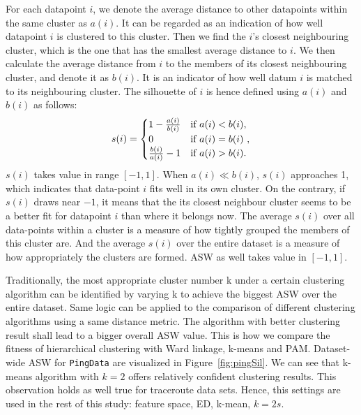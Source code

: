 For each datapoint $i$, we denote the average distance to other datapoints within the same cluster as $a(i)$.
It can be regarded as an indication of how well datapoint $i$ is clustered to this cluster. 
Then we find the $i$'s closest neighbouring cluster, which is the one that has the smallest average distance to $i$. 
We then calculate the average distance from $i$ to the members of its closest neighbouring cluster, and denote it as $b(i)$. It is an indicator of how well datum $i$ is matched to its neighbouring cluster. 
The silhouette of $i$ is hence defined using $a(i)$ and $b(i)$ as follows:
\begin{align*}
s(i) =
\begin{cases} 
       1-\frac{a(i)}{b(i)}    \hfill & \text{if $a(i)<b(i)$}, \\
       0 \hfill & \text{if $a(i) = b(i)$ }, \\
       \frac{b(i)}{a(i)} - 1 \hfill & \text{if $a(i)>b(i)$}.\\
  \end{cases}
\end{align*}
$s(i)$ takes value in range $[-1,1]$. When $a(i) \ll b(i)$, $s(i)$ approaches 1, which indicates that data-point $i$ fits well in its own cluster. 
On the contrary, if $s(i)$ draws near $-1$, it means that the its closest neighbour cluster seems to be a better fit for datapoint $i$ than where it belongs now. 
The average $s(i)$ over all data-points within a cluster is a measure of how tightly grouped the members of this cluster are. 
And the average $s(i)$ over the entire dataset is a measure of how appropriately the clusters are formed.
\ac{ASW} as well takes value in $[-1,1]$.

Traditionally, the most appropriate cluster number k under a certain clustering algorithm can be identified by varying k to achieve the biggest \ac{ASW} over the entire dataset.
Same logic can be applied to the comparison of different clustering algorithms using a same distance metric.
The algorithm with better clustering result shall lead to a bigger overall \ac{ASW} value.
This is how we compare the fitness of hierarchical clustering with Ward linkage, k-means and \ac{PAM}.
Dataset-wide \ac{ASW} for \texttt{PingData} are visualized in Figure~\ref{fig:pingSil}. We can see that k-means algorithm with $k=2$ offers relatively confident clustering results. 
This observation holds as well true for traceroute data sets.
Hence, this settings are used in the rest of this study: feature space, \acf{ED}, k-mean, $k=2s$.



